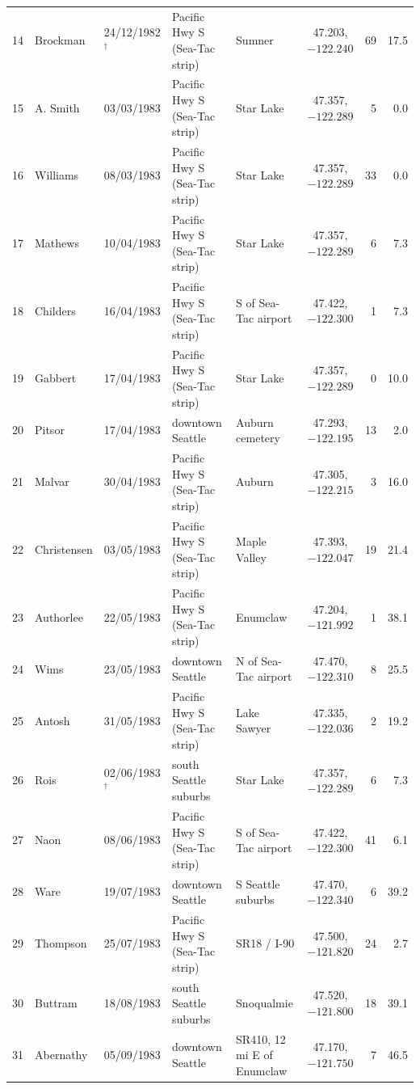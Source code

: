 \documentclass[11pt,a4paper]{article}
\begin{document}
{\begin{longtable}{rllp{3.1cm}p{3.1cm}crr}
14 & Brockman & 24/12/1982$^\dagger$ & Pacific Hwy S (Sea-Tac strip) & Sumner & 47.203, $-122.240$ & 69 & 17.5\\
15 & A. Smith & 03/03/1983 & Pacific Hwy S (Sea-Tac strip) & Star Lake & 47.357, $-122.289$ & 5 & 0.0\\
16 & Williams & 08/03/1983 & Pacific Hwy S (Sea-Tac strip) & Star Lake & 47.357, $-122.289$ & 33 & 0.0\\
17 & Mathews & 10/04/1983 & Pacific Hwy S (Sea-Tac strip) & Star Lake & 47.357, $-122.289$ & 6 & 7.3\\
18 & Childers & 16/04/1983 & Pacific Hwy S (Sea-Tac strip) & S of Sea-Tac airport & 47.422, $-122.300$ & 1 & 7.3\\
19 & Gabbert & 17/04/1983 & Pacific Hwy S (Sea-Tac strip) & Star Lake & 47.357, $-122.289$ & 0 & 10.0\\
20 & Pitsor & 17/04/1983 & downtown Seattle & Auburn cemetery & 47.293, $-122.195$ & 13 & 2.0\\
21 & Malvar & 30/04/1983 & Pacific Hwy S (Sea-Tac strip) & Auburn & 47.305, $-122.215$ & 3 & 16.0\\
22 & Christensen & 03/05/1983 & Pacific Hwy S (Sea-Tac strip) & Maple Valley & 47.393, $-122.047$ & 19 & 21.4\\
23 & Authorlee & 22/05/1983 & Pacific Hwy S (Sea-Tac strip) & Enumclaw & 47.204, $-121.992$ & 1 & 38.1\\
24 & Wims & 23/05/1983 & downtown Seattle & N of Sea-Tac airport & 47.470, $-122.310$ & 8 & 25.5\\
25 & Antosh & 31/05/1983 & Pacific Hwy S (Sea-Tac strip) & Lake Sawyer & 47.335, $-122.036$ & 2 & 19.2\\
26 & Rois & 02/06/1983$^\dagger$ & south Seattle suburbs & Star Lake & 47.357, $-122.289$ & 6 & 7.3\\
27 & Naon & 08/06/1983 & Pacific Hwy S (Sea-Tac strip) & S of Sea-Tac airport & 47.422, $-122.300$ & 41 & 6.1\\
28 & Ware & 19/07/1983 & downtown Seattle & S Seattle suburbs & 47.470, $-122.340$ & 6 & 39.2\\
29 & Thompson & 25/07/1983 & Pacific Hwy S (Sea-Tac strip) & SR18 / I-90 & 47.500, $-121.820$ & 24 & 2.7\\
30 & Buttram & 18/08/1983 & south Seattle suburbs & Snoqualmie & 47.520, $-121.800$ & 18 & 39.1\\
31 & Abernathy & 05/09/1983 & downtown Seattle & SR410, 12 mi E of Enumclaw & 47.170, $-121.750$ & 7 & 46.5\\

\end{longtable}}
\end{document}
